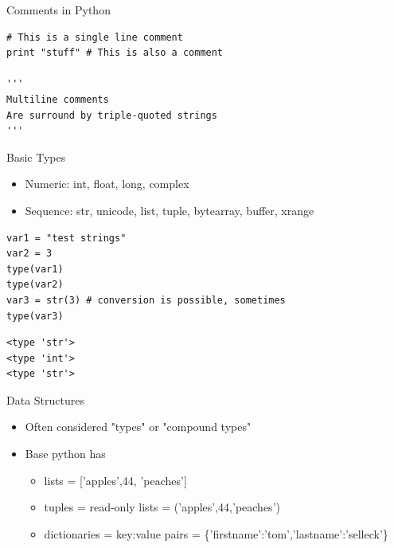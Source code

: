 \documentclass[presentation]{beamer}
\begin{document}
\begin{frame}[fragile,label=sec-4-1-3]{Comments in Python}
 \lstset{numbers=left,language=Python,label= ,caption= }
\begin{lstlisting}
# This is a single line comment
print "stuff" # This is also a comment

'''
Multiline comments 
Are surround by triple-quoted strings
'''
\end{lstlisting}

\end{frame}




\begin{frame}[fragile,label=sec-4-1-4]{Basic Types}
 \begin{itemize}
\item Numeric: int, float, long, complex
\item Sequence: str, unicode, list, tuple, bytearray, buffer, xrange
\end{itemize}
\lstset{numbers=left,language=Python,label= ,caption= }
\begin{lstlisting}
var1 = "test strings"
var2 = 3      
type(var1) 
type(var2)
var3 = str(3) # conversion is possible, sometimes
type(var3)
\end{lstlisting}

\lstset{numbers=left,language=Python,label= ,caption= }
\begin{lstlisting}
<type 'str'>
<type 'int'>
<type 'str'>
\end{lstlisting}
\end{frame}


\begin{frame}[label=sec-4-1-5]{Data Structures}
\begin{itemize}
\item Often considered "types" or "compound types"
\item Base python has
\begin{itemize}
\item lists = ['apples',44, 'peaches']
\item tuples = read-only lists = ('apples',44,'peaches')
\item dictionaries = key:value pairs = \{'firstname':'tom','lastname':'selleck'\}
\end{itemize}
\end{itemize}
\end{frame}
\end{document}
